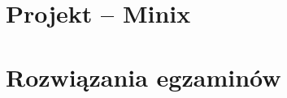 \documentclass[12pt, a4paper, polish, openany]{book}
\begin{document}
\frontmatter



\tableofcontents


\mainmatter

\chapter{Projekt -- Minix}


\chapter{Rozwiązania egzaminów}


%
\end{document}
